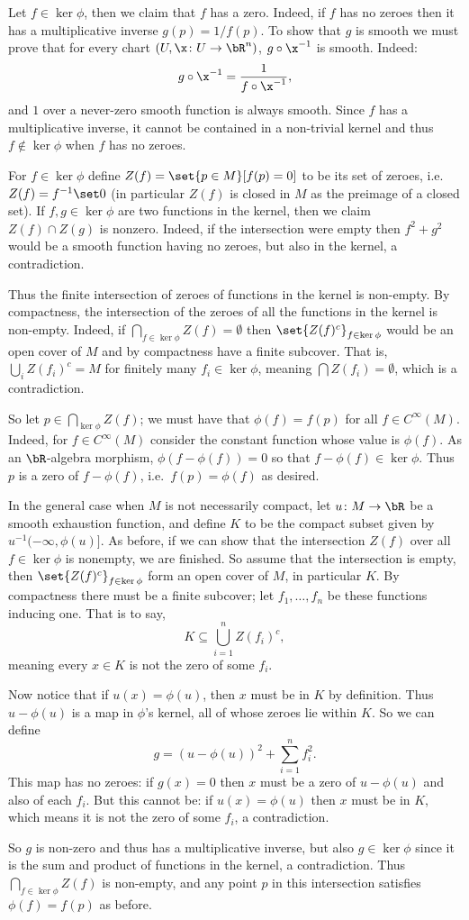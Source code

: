 Let $f\in\ker\phi$, then we claim that $f$ has a zero.
Indeed, if $f$ has no zeroes then it has a multiplicative inverse $g(p)=1/f(p)$.
To show that $g$ is smooth we must prove that for every chart $(U,\x\colon U\to\bR^n)$, $g\circ\x^{-1}$ is
smooth.
Indeed:
$$ g\circ\x^{-1} = \frac1{f\circ\x^{-1}}, $$
and $1$ over a never-zero smooth function is always smooth.
Since $f$ has a multiplicative inverse, it cannot be contained in a non-trivial kernel and thus
$f\notin\ker\phi$ when $f$ has no zeroes.

For $f\in\ker\phi$ define $Z(f)=\set{p\in M}[f(p)=0]$ to be its set of zeroes, i.e.\ $Z(f)=f^{-1}\set0$
(in particular $Z(f)$ is closed in $M$ as the preimage of a closed set).
If $f,g\in\ker\phi$ are two functions in the kernel, then we claim $Z(f)\cap Z(g)$ is nonzero.
Indeed, if the intersection were empty then $f^2+g^2$ would be a smooth function having no zeroes, but also
in the kernel, a contradiction.

Thus the finite intersection of zeroes of functions in the kernel is non-empty.
By compactness, the intersection of the zeroes of all the functions in the kernel is non-empty.
Indeed, if $\bigcap_{f\in\ker\phi}Z(f)=\emptyset$ then $\set{Z(f)^c}_{f\in\ker\phi}$ would be an open cover
of $M$ and by compactness have a finite subcover.
That is, $\bigcup_iZ(f_i)^c=M$ for finitely many $f_i\in\ker\phi$, meaning $\bigcap Z(f_i)=\emptyset$,
which is a contradiction.

So let $p\in\bigcap_{\ker\phi}Z(f)$; we must have that $\phi(f)=f(p)$ for all $f\in C^\infty(M)$.
Indeed, for $f\in C^\infty(M)$ consider the constant function whose value is $\phi(f)$.
As an $\bR$-algebra morphism, $\phi(f-\phi(f))=0$ so that $f-\phi(f)\in\ker\phi$.
Thus $p$ is a zero of $f-\phi(f)$, i.e.\ $f(p)=\phi(f)$ as desired.

In the general case when $M$ is not necessarily compact, let $u\colon M\to\bR$ be a smooth exhaustion function, and define $K$ to be the compact subset given by
$u^{-1}(-\infty,\phi(u)]$.
As before, if we can show that the intersection $Z(f)$ over all $f\in\ker\phi$ is nonempty, we are finished.
So assume that the intersection is empty, then $\set{Z(f)^c}_{f\in\ker\phi}$ form an open cover of $M$,
in particular $K$.
By compactness there must be a finite subcover; let $f_1,\dots,f_n$ be these functions inducing one.
That is to say,
$$ K \subseteq \bigcup_{i=1}^n Z(f_i)^c, $$
meaning every $x\in K$ is not the zero of some $f_i$.

Now notice that if $u(x)=\phi(u)$, then $x$ must be in $K$ by definition.
Thus $u-\phi(u)$ is a map in $\phi$'s kernel, all of whose zeroes lie within $K$.
So we can define
$$ g = (u-\phi(u))^2 + \sum_{i=1}^n f_i^2 . $$
This map has no zeroes: if $g(x)=0$ then $x$ must be a zero of $u-\phi(u)$ and also of each $f_i$.
But this cannot be: if $u(x)=\phi(u)$ then $x$ must be in $K$, which means it is not the zero of some $f_i$, a contradiction.

So $g$ is non-zero and thus has a multiplicative inverse, but also $g\in\ker\phi$ since it is the sum and product of functions in the kernel, a contradiction.
Thus $\bigcap_{f\in\ker\phi}Z(f)$ is non-empty, and any point $p$ in this intersection satisfies $\phi(f)=f(p)$ as before.




